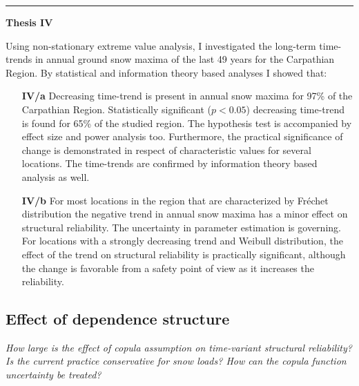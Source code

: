 \begin{center}
	\noindent\rule[0.5ex]{0.5\linewidth}{0.5pt}
	\item[\textbf{Thesis IV}] \hfill
\end{center}
Using non-stationary extreme value analysis, I investigated the long-term time-trends in annual ground snow maxima of the last 49 years for the Carpathian Region. By statistical and information theory based analyses I showed that:
\begin{enumerate}[leftmargin=*, align=left, labelwidth=*]
	\item[\textbf{IV/a}] Decreasing time-trend is present in annual snow maxima for 97\% of the Carpathian Region. Statistically significant ($p<0.05$) decreasing time-trend is found for 65\% of the studied region. The hypothesis test is accompanied by effect size and power analysis too. Furthermore, the practical significance of change is demonstrated in respect of characteristic values for several locations. The time-trends are confirmed by information theory based analysis as well.
	
	\item[\textbf{IV/b}] For most locations in the region that are characterized by Fréchet distribution the negative trend in annual snow maxima has a minor effect on structural reliability. The uncertainty in parameter estimation is governing. For locations with a strongly decreasing trend and Weibull distribution, the effect of the trend on structural reliability is practically significant, although the change is favorable from a safety point of view as it increases the reliability.
\end{enumerate}

\citep{RozsasIdojaras2016, RozsasAMM2016, SykoraIALCCE2016}


\subsection{Effect of dependence structure}
 
\textit{How large is the effect of copula assumption on time-variant structural reliability? Is the current practice conservative for snow loads? How can the copula function uncertainty be treated?}

